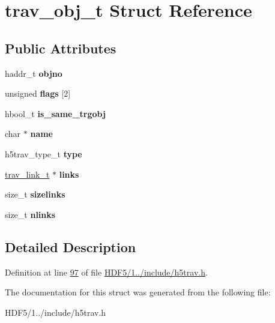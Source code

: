 \hypertarget{structtrav__obj__t}{}\section{trav\+\_\+obj\+\_\+t Struct Reference}
\label{structtrav__obj__t}
\subsection*{Public Attributes}
\begin{DoxyCompactItemize}
\item 
\mbox{\label{structtrav__obj__t_a0ba92ea64afcae67e202d38223163d12}} 
haddr\+\_\+t {\bfseries objno}
\item 
\mbox{\label{structtrav__obj__t_ae84578ce9c5a1e5c5a8714129ba44f24}} 
unsigned {\bfseries flags} \mbox{[}2\mbox{]}
\item 
\mbox{\label{structtrav__obj__t_ad6255674ada78da4b2bf22ccf6200f77}} 
hbool\+\_\+t {\bfseries is\+\_\+same\+\_\+trgobj}
\item 
\mbox{\label{structtrav__obj__t_ac0e898ac49a3ef05e603a41586f68397}} 
char $\ast$ {\bfseries name}
\item 
\mbox{\label{structtrav__obj__t_aa47ed1b015f6b68396f161da66d677e2}} 
h5trav\+\_\+type\+\_\+t {\bfseries type}
\item 
\mbox{\label{structtrav__obj__t_a3950bbd4d746f64bcc8dc57e5ab31f30}} 
\hyperlink{structtrav__link__t}{trav\+\_\+link\+\_\+t} $\ast$ {\bfseries links}
\item 
\mbox{\label{structtrav__obj__t_a5e3100a8b06d6d5191dd722791d4fa1f}} 
size\+\_\+t {\bfseries sizelinks}
\item 
\mbox{\label{structtrav__obj__t_aedb4616975cabf227d9920bbbc7b9771}} 
size\+\_\+t {\bfseries nlinks}
\end{DoxyCompactItemize}


\subsection{Detailed Description}


Definition at line \hyperlink{_h_d_f5_21_810_81_2include_2h5trav_8h_source_l00097}{97} of file \hyperlink{_h_d_f5_21_810_81_2include_2h5trav_8h_source}{H\+D\+F5/1../include/h5trav.\+h}.



The documentation for this struct was generated from the following file\+:\begin{DoxyCompactItemize}
\item 
H\+D\+F5/1../include/h5trav.\+h\end{DoxyCompactItemize}

